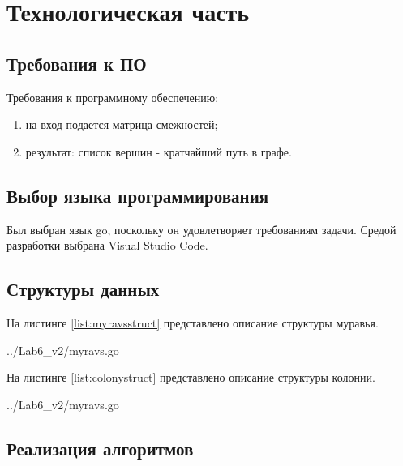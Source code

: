 
\chapter{Технологическая часть}\label{tecnology}

\section{Требования к ПО}\label{Requirements}

Требования к программному обеспечению:
\begin{enumerate}
    \item на вход подается матрица смежностей;
    \item результат: список вершин - кратчайший путь в графе. 
\end{enumerate}

\section{Выбор языка программирования}\label{Language}

Был выбран язык go, поскольку он удовлетворяет требованиям задачи. Средой разработки выбрана Visual Studio Code.

\section{Структуры данных}\label{StructsList}

На листинге \ref{list:myravsstruct} представлено описание структуры муравья.

\begin{lstinputlisting}
    [caption = {Структура муравья},
    label = {list:myravsstruct},
    linerange={11-16},
    ]{../Lab6_v2/myravs.go}
\end{lstinputlisting}

\newpage 

На листинге \ref{list:colonystruct} представлено описание структуры колонии.


\begin{lstinputlisting}
    [caption = {Структура колонии},
    label = {list:colonystruct},
    linerange={18-26},
    ]{../Lab6_v2/myravs.go}
\end{lstinputlisting}

\section{Реализация алгоритмов}\label{Listings}

